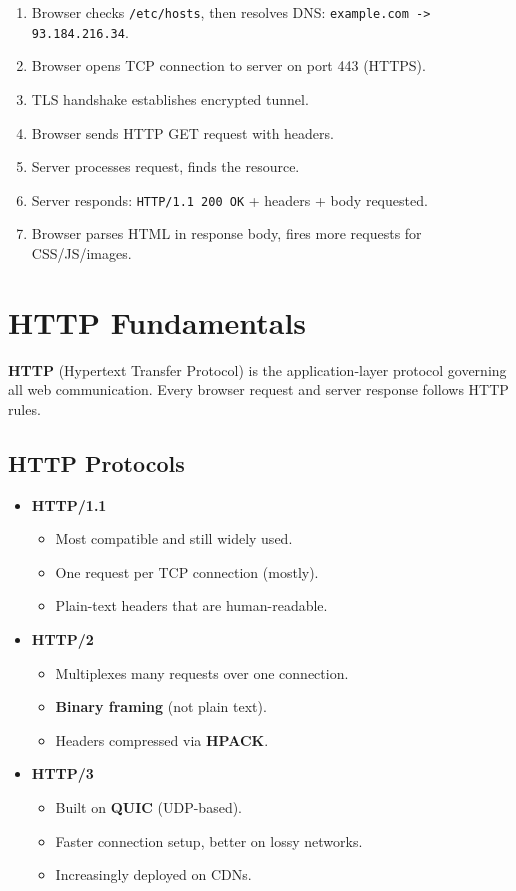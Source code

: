 \documentclass[12pt, letterpaper]{article}
\begin{document}
\begin{enumerate}
    \item Browser checks \texttt{/etc/hosts}, then resolves DNS: \texttt{example.com -> 93.184.216.34}.
    \item Browser opens TCP connection to server on port 443 (HTTPS).
    \item TLS handshake establishes encrypted tunnel.
    \item Browser sends HTTP GET request with headers.
    \item Server processes request, finds the resource.
    \item Server responds: \texttt{HTTP/1.1 200 OK} + headers + body requested.
    \item Browser parses HTML in response body, fires more requests for CSS/JS/images.
\end{enumerate}

\section*{HTTP Fundamentals}

\textbf{HTTP} (Hypertext Transfer Protocol) is the application-layer protocol governing all web communication. Every browser request and server response follows HTTP rules.

\subsection*{HTTP Protocols}

\begin{itemize}
    \item \textbf{HTTP/1.1}
        \begin{itemize}
            \item Most compatible and still widely used.
            \item One request per TCP connection (mostly).
            \item Plain-text headers that are human-readable.
        \end{itemize}
    \item \textbf{HTTP/2}
        \begin{itemize}
            \item Multiplexes many requests over one connection.
            \item \textbf{Binary framing} (not plain text).
            \item Headers compressed via \textbf{HPACK}.
        \end{itemize}
    \item \textbf{HTTP/3}
        \begin{itemize}
            \item Built on \textbf{QUIC} (UDP-based).
            \item Faster connection setup, better on lossy networks.
            \item Increasingly deployed on CDNs.
        \end{itemize}
\end{itemize}
\end{document}
